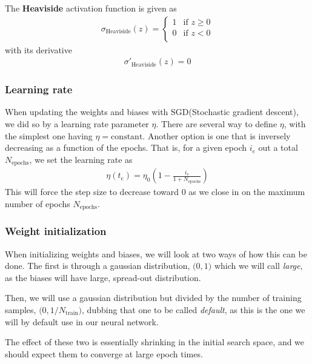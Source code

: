 The \textbf{Heaviside} activation function is given as
\begin{align}
    \sigma_\mathrm{Heaviside}(z) = 
    \begin{cases}
        1 & \text{if } z \geq 0 \\
        0 & \text{if } z < 0 \\
    \end{cases}
    \label{eq:act-heaviside}
\end{align}
with its derivative
\begin{align}
    \sigma'_\mathrm{Heaviside}(z) = 0
    \label{eq:act-heaviside-der}
\end{align}

\subsubsection{Learning rate}
When updating the weights and biases with SGD(Stochastic gradient descent), we did so by a learning rate parameter $\eta$. There are several way to define $\eta$, with the simplest one having $\eta=\mathrm{constant}$. Another option is one that is inversely decreasing as a function of the epochs. That is, for a given epoch $i_e$ out a total $N_\mathrm{epochs}$, we set the learning rate as
\begin{align}
    \eta(t_e) = \eta_0 (1 - \frac{i_e}{1 + N_\mathrm{epochs}})
    \label{eq:inverse-eta}
\end{align}
This will force the step size to decrease toward 0 as we close in on the maximum number of epochs $N_\mathrm{epochs}$.

\subsubsection{Weight initialization} \label{sec:nn-weights}
When initializing weights and biases, we will look at two ways of how this can be done. The first is through a gaussian distribution, $\mathcal(0, 1)$ which we will call \textit{large}, as the biases will have large, spread-out distribution.

Then, we will use a gaussian distribution but divided by the number of training samples, $\mathcal(0, 1/{N_\mathrm{train}})$, dubbing that one to be called \textit{default}, as this is the one we will by default use in our neural network.

The effect of these two is essentially shrinking in the initial search space, and we should expect them to converge at large epoch times.